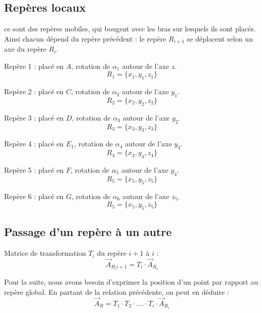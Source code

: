 \documentclass[12pt,a4paper]{article}
\begin{document}
\subsection{Repères locaux}
ce sont des repères mobiles, qui bougent avec les bras sur lesquels ils sont placés. Ainsi chacun dépend du repère précédent : le repère $R_{i+1}$ se déplacent selon un axe du repère $R_i$.
\medbreak

Repère 1 : placé en $A$, rotation de $\alpha_1$ autour de l'axe $z$.
\begin{equation}
R_1=\{x_1,y_1,z_1\}
\end{equation}

\medbreak
Repère 2 : placé en $C$, rotation de $\alpha_2$ autour de l'axe $y_1$.
\begin{equation}
R_2=\{x_2,y_2,z_2\}
\end{equation}


\medbreak
Repère 3 : placé en $D$, rotation de $\alpha_3$ autour de l'axe $y_2$.
\begin{equation}
R_3=\{x_3,y_3,z_3\}
\end{equation}

\medbreak
Repère 4 : placé en $E_1$, rotation de $\alpha_4$ autour de l'axe $y_3$.
\begin{equation}
R_4=\{x_4,y_4,z_4\}
\end{equation}

\medbreak
Repère 5 : placé en $F$, rotation de $\alpha_5$ autour de l'axe $y_4$.
\begin{equation}
R_5=\{x_5,y_5,z_5\}
\end{equation}

\medbreak
Repère 6 : placé en $G$, rotation de $\alpha_6$ autour de l'axe $z_5$.
\begin{equation}
R_5=\{x_5,y_5,z_5\}
\end{equation}

\subsection{Passage d'un repère à un autre}
Matrice de transformation $T_i$ du repère $i+1$ à $i$ : 
\begin{equation}
\vec{A}_{R_i{i+1}}=T_i \cdot \vec{A}_{R_i}
\end{equation}

Pour la suite, nous avons besoin d'exprimer la position d'un point par rapport au repère global. En partant de la relation précédente, on peut en déduire : 
\begin{equation}
\vec{A}_R=T_1 \cdot T_2 \cdot .... \cdot T_i \cdot \vec{A}_{R_i}
\end{equation}
\end{document}
